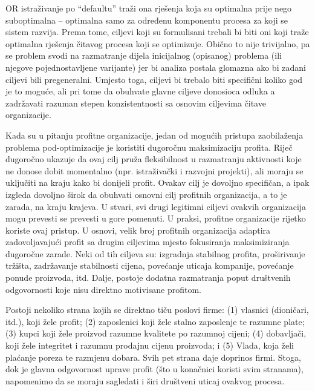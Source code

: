 \documentclass[a4paper, utf8, 11pt, colorlinks]{book}
\begin{document}
OR istraživanje po ``defaultu'' traži ona rješenja koja su optimalna prije nego suboptimalna -- optimalna samo za određenu komponentu procesa za koji se sistem razvija. Prema tome, ciljevi koji su formulisani trebali bi biti oni koji traže optimalna rješenja čitavog procesa koji se optimizuje.  Obično to nije trivijalno, pa se problem svodi na razmatranje dijela inicijalnog (opisanog) problema (ili njegove pojednostavljene varijante) jer bi analiza postala glomazna ako bi zadani ciljevi bili pregeneralni. Umjesto toga, ciljevi bi trebalo biti specifični 
koliko god je to moguće, ali pri tome da obuhvate glavne ciljeve donosioca odluka a zadržavati razuman stepen konzistentnosti sa osnovim ciljevima čitave organizacije. 

Kada su u pitanju profitne organizacije, jedan od mogućih pristupa zaobilaženja problema pod-optimizacije je koristiti dugoročnu maksimizaciju profita. Riječ dugoročno ukazuje da ovaj cilj pruža fleksibilnost u razmatranju aktivnosti koje ne donose dobit momentalno 
(npr. istraživački i razvojni projekti), ali moraju se uključiti na kraju kako bi donijeli profit. Ovakav cilj je   dovoljno specifičan, a ipak izgleda dovoljno širok da obuhvati osnovni cilj profitnih organizacija, a to je zarada, na kraju krajeva. U stvari, svi drugi legitimni ciljevi ovakvih organizacija mogu prevesti se prevesti u gore pomenuti. U praksi, profitne organizacije rijetko koriste ovaj pristup. U osnovi, velik broj profitnih organizacija adaptira zadovoljavajući profit sa drugim ciljevima mjesto fokusiranja maksimiziranja dugoročne zarade. Neki od tih ciljeva su: izgradnja stabilnog profita, proširivanje tržišta, zadržavanje stabilnosti cijena, povećanje uticaja kompanije, povećanje ponude proizvoda, itd. 
Dalje, postoje dodatna razmatranja poput društvenih odgovornosti koje nisu direktno motivisane profitom.  

Postoji nekoliko strana kojih se direktno tiču poslovi firme: (1) vlasnici (dioničari, itd.), koji žele profit;   (2) zaposlenici koji žele stalno zaposlenje te razumne plate; (3) kupci koji žele proizvod razumne kvalitete po razumnoj cijeni;
(4) dobavljači, koji žele integritet i razumnu prodajnu cijenu proizvoda; i
(5) Vlada, koja želi plaćanje poreza te razmjenu dobara. Svih pet strana daje doprinos firmi. Stoga, dok je glavna odgovornost uprave profit (što u konačnici koristi svim stranama), napomenimo da se moraju sagledati i širi društveni uticaj ovakvog procesa. 
 
\end{document}
